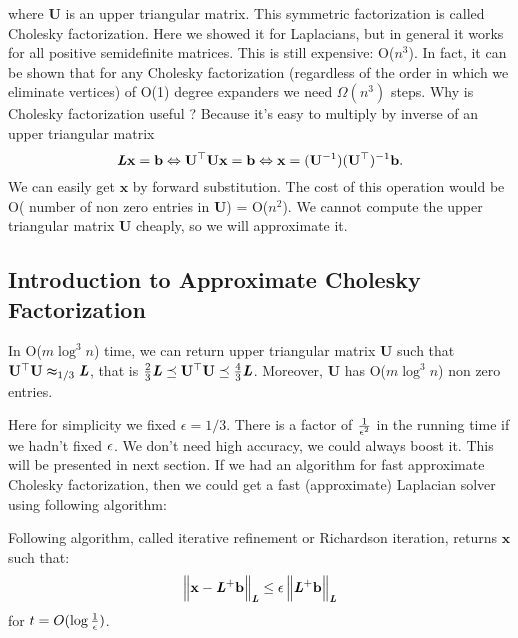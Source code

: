 \documentclass[11pt]{article}
\newcommand{\specApp}[3]{#1 \thickapprox_#2 #3}
\renewcommand{\tr}[1]{\ensuremath{{#1}}^{\top}}
\begin{document}
where $\mathbf{U}$ is an upper triangular matrix.\newline
This symmetric factorization is called Cholesky factorization. Here we showed it for Laplacians, but in general it works for all positive semidefinite matrices.
This is still expensive: O($n^3$). In fact, it can be shown that for any Cholesky factorization (regardless of the order in which we eliminate vertices) of O(1) degree expanders we need $\Omega (n^3)$ steps. 
Why is Cholesky factorization useful ? Because it's easy to multiply by inverse of an upper triangular matrix
\[\LL \mathbf{x} = \mathbf{b} \iff \tr{\mathbf{U}} \mathbf{U} \mathbf{x} = \mathbf{b} \iff \mathbf{x} = (\mathbf{U}^{-1})(\tr {\mathbf{U}})^{-1} \mathbf{b}.\]
We can easily get $\mathbf{x}$ by forward substitution. The cost of this operation would be O( number of non zero entries in $\mathbf{U}$) = O($n^2$).
We cannot compute the upper triangular matrix $\mathbf{U}$ cheaply, so we will approximate it.

\subsection{Introduction to Approximate Cholesky Factorization}

\begin{theorem}
 In O($m \log^3 n$)  time, we can return upper triangular matrix $\mathbf{U}$ such that $ \specApp {\tr {\mathbf{U}}\mathbf{U}} {{1/3}} {\LL}$, that is $ \frac {2}{3} \LL \preceq \tr{\mathbf{U}} \mathbf{U} \preceq \frac {4}{3} \LL$. Moreover, $\mathbf{U}$ has O($m\log^3n$) non zero entries.
\end{theorem}
Here for simplicity we fixed $\epsilon = 1/3$. There is a factor of $\frac {1}{\epsilon^2}$ in the running time if we hadn't fixed $\epsilon$. We don't need high accuracy, we could always boost it. This will be presented in next section. \newline 
If we had an algorithm for fast approximate Cholesky factorization, then we could get a fast (approximate) Laplacian solver using following algorithm:
\begin{corollary}
Following algorithm, called iterative refinement or Richardson iteration, returns $\mathbf{x}$ such that:
\[\left\lVert \mathbf{x} - \boldsymbol{\mathit{L}}^+ \mathbf{b} \right\rVert_{\boldsymbol{\mathit{L}}} \le \epsilon \left\lVert \boldsymbol{\mathit{L}}^+ \mathbf{b} \right\rVert_{\boldsymbol{\mathit{L}}}\]
for $t=O(\log \frac{1}{\epsilon})$.
\end{corollary}
\end{document}
